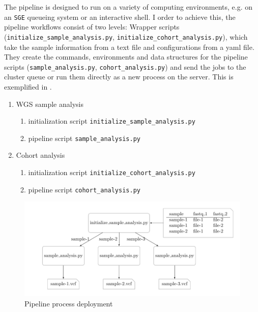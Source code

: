 \documentclass[a4paper]{article}
\begin{document}
The pipeline is designed to run on a variety of computing
environments, e.g. on an \texttt{SGE} queueing system or an
interactive shell. I order to achieve this, the pipeline workflows
consist of two levels: Wrapper scripts
(\texttt{initialize\_sample\_analysis.py},
\texttt{initialize\_cohort\_analysis.py}), which take the sample
information from a text file and configurations from a yaml file. They
create the commands, environments and data structures for the pipeline
scripts (\texttt{sample\_analysis.py}, \texttt{cohort\_analysis.py})
and send the jobs to the cluster queue or run them directly as a new
process on the server. This is exemplified in
.


\begin{enumerate}
\item WGS sample analysis
  \begin{enumerate}
  \item initialization script \texttt{initialize\_sample\_analysis.py}
  \item pipeline script \texttt{sample\_analysis.py}
  \end{enumerate}

\item Cohort analysis
  \begin{enumerate}
  \item initialization script \texttt{initialize\_cohort\_analysis.py}
  \item pipeline script \texttt{cohort\_analysis.py}
  \end{enumerate}

\end{enumerate}


\begin{figure}
  \begin{center}
    \includegraphics[scale=0.8]{fig-pipeline-structure.pdf}
    \caption[cohort analysis]{Pipeline process deployment}
  \label{fig:pipelineProcess}
\end{center}
\end{figure}
\end{document}
